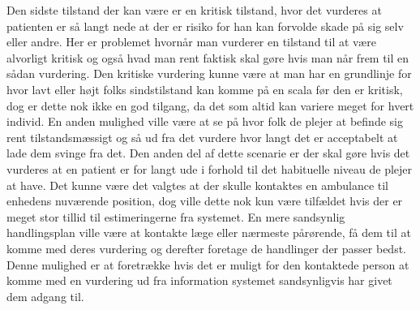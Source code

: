 Den sidste tilstand der kan være er en kritisk tilstand, hvor det vurderes at patienten er så langt nede at der er risiko for han kan forvolde skade på sig selv eller andre.
Her er problemet hvornår man vurderer en tilstand til at være alvorligt kritisk og også hvad man rent faktisk skal gøre hvis man når frem til en sådan vurdering.
Den kritiske vurdering kunne være at man har en grundlinje for hvor lavt eller højt folks sindstilstand kan komme på en scala før den er kritisk, dog er dette nok ikke en god tilgang, da det som altid kan variere meget for hvert individ.
En anden mulighed ville være at se på hvor folk de plejer at befinde sig rent tilstandsmæssigt og så ud fra det vurdere hvor langt det er acceptabelt at lade dem svinge fra det.
Den anden del af dette scenarie er der skal gøre hvis det vurderes at en patient er for langt ude i forhold til det habituelle niveau de plejer at have.
Det kunne være det valgtes at der skulle kontaktes en ambulance til enhedens nuværende position, dog ville dette nok kun være tilfældet hvis der er meget stor tillid til estimeringerne fra systemet.
En mere sandsynlig handlingsplan ville være at kontakte læge eller nærmeste pårørende, få dem til at komme med deres vurdering og derefter foretage de handlinger der passer bedst.
Denne mulighed er at foretrække hvis det er muligt for den kontaktede person at komme med en vurdering ud fra information systemet sandsynligvis har givet dem adgang til.

